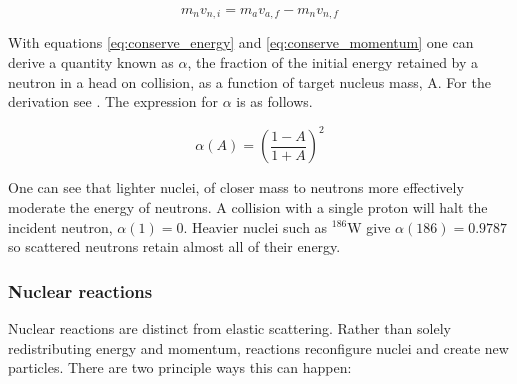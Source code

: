 %
%
%

\begin{equation}
  m_{n}v_{n,i} = m_{a}v_{a,f} - m_{n}v_{n,f}
  \label{eq:conserve_momentum}
\end{equation}

With equations \ref{eq:conserve_energy} and \ref{eq:conserve_momentum} one can derive a quantity known as $\alpha$, the fraction of the initial energy retained by a neutron in a head on collision, as a function of target nucleus mass, A. For the derivation see \cite{harms1975}. The expression for $\alpha$ is as follows.

\begin{equation}
  \alpha(A) = \left(\frac{1-A}{1+A}\right)^2
  \label{eq:alpha}
\end{equation}

One can see that lighter nuclei, of closer mass to neutrons more effectively moderate the energy of neutrons. A collision with a single proton will halt the incident neutron, $\alpha(1) = 0$. Heavier nuclei such as $^{186}$W give $\alpha(186) = 0.9787$ so scattered neutrons retain almost all of their energy.

%
%
%
%

\subsubsection{Nuclear reactions}
\label{sec:nuclear_reactions}
Nuclear reactions are distinct from elastic scattering. Rather than solely redistributing energy and momentum, reactions reconfigure nuclei and create new particles. There are two principle ways this can happen:

